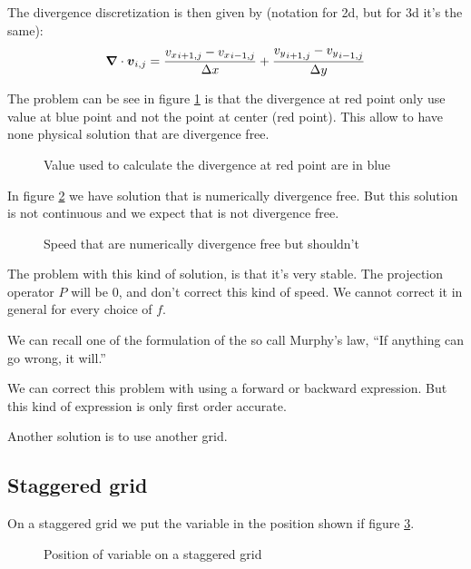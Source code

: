 The divergence discretization is then given by (notation for 2d, but for 3d it's the same):
\begin{equation}
  {\boldsymbol {\nabla}} \cdot {\boldsymbol {v}}_{i,j}=\frac{{v_{x}}_{i+1,j}-{v_{x}}_{i-1,j}}{\Delta x}+\frac{{v_{y}}_{i+1,j}-{v_{y}}_{i-1,j}}{\Delta y}
\end{equation}

The problem can be see in figure \ref{fixed:unstaggered_div} is that the divergence at red point only use value at blue point and not the point at center (red point).
This allow to have none physical solution that are divergence free.

\begin{figure}
\caption{Value used to calculate the divergence at red point are in blue}
\label{fixed:unstaggered_div}
\end{figure}

In figure \ref{fixed:unstaggered_div2} we have solution that is numerically divergence free. But this solution is not continuous and we expect that is not divergence free.

\begin{figure}
\caption{Speed that are numerically divergence free but shouldn't}
\label{fixed:unstaggered_div2}
\end{figure}

The problem with this kind of solution, is that it's very stable.
The projection operator $P$ will be 0, and don't correct this kind of speed. We cannot correct it in general for every choice of $f$.

We can recall one of the formulation of the so call Murphy's law, ``If anything can go wrong, it will.''

We can correct this problem with using a forward or backward expression. But this kind of expression is only first order accurate.

Another solution is to use another grid.

\subsection{Staggered grid}

On a staggered grid we put the variable in the position shown if figure \ref{fixed:staggered}.

\begin{figure}
\caption{Position of variable on a staggered grid}
\label{fixed:staggered}
\end{figure}

